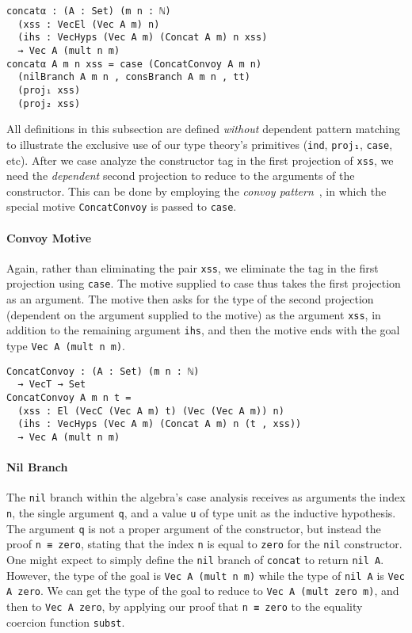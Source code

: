 \documentclass[preprint,nonatbib]{sigplanconf}
\begin{document}
\begin{verbatim}
concatα : (A : Set) (m n : ℕ)
  (xss : VecEl (Vec A m) n)
  (ihs : VecHyps (Vec A m) (Concat A m) n xss)
  → Vec A (mult n m)
concatα A m n xss = case (ConcatConvoy A m n)
  (nilBranch A m n , consBranch A m n , tt)
  (proj₁ xss)
  (proj₂ xss)
\end{verbatim}

All definitions in this subsection are defined {\it without} dependent
pattern matching to illustrate the exclusive use of our type theory's
primitives ({\tt ind}, {\tt proj₁}, {\tt case}, etc). After we case
analyze the constructor tag in the first projection of {\tt xss}, we
need the {\it dependent} second projection to reduce to the arguments
of the constructor. This can be done by employing the
{\it convoy pattern}~\citep{chlipala2011certified}, in which the special motive
{\tt ConcatConvoy} is passed to {\tt case}.

\paragraph{Convoy Motive}

Again, rather than eliminating the pair {\tt xss}, we eliminate the
tag in the first projection using {\tt case}. The motive supplied to
case thus takes the first projection as an argument. The motive then
asks for the type of the second projection (dependent on the argument
supplied to the motive) as the argument {\tt xss}, in addition to the
remaining argument {\tt ihs}, and then the motive ends with the goal type
{\tt Vec A (mult n m)}.

\begin{verbatim}
ConcatConvoy : (A : Set) (m n : ℕ)
  → VecT → Set
ConcatConvoy A m n t =
  (xss : El (VecC (Vec A m) t) (Vec (Vec A m)) n)
  (ihs : VecHyps (Vec A m) (Concat A m) n (t , xss))
  → Vec A (mult n m)
\end{verbatim}

\paragraph{Nil Branch}

The {\tt nil} branch within the algebra's case analysis receives as
arguments the index {\tt n}, the single argument {\tt q}, and a value
{\tt u} of type unit as the inductive hypothesis. The argument
{\tt q} is not a proper argument of the constructor, but instead the
proof {\tt n ≡ zero}, stating that the index {\tt n} is equal to
{\tt zero} for the {\tt nil} constructor. One might expect to simply
define the {\tt nil} branch of {\tt concat} to return {\tt nil A}.
However, the type of the goal is {\tt Vec A (mult n m)} while the type
of {\tt nil A} is {\tt Vec A zero}. We can get the type of the goal to
reduce to {\tt Vec A (mult zero m)}, and then to {\tt Vec A zero}, by
applying our proof that {\tt n ≡ zero} to the equality coercion
function {\tt subst}.
\end{document}
